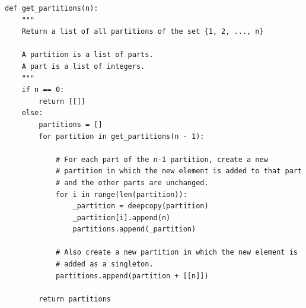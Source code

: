 \documentclass[12pt]{article}
\begin{document}
\begin{mdframed}
\begin{verbatim}
def get_partitions(n):
    """
    Return a list of all partitions of the set {1, 2, ..., n}

    A partition is a list of parts.
    A part is a list of integers.
    """
    if n == 0:
        return [[]]
    else:
        partitions = []
        for partition in get_partitions(n - 1):

            # For each part of the n-1 partition, create a new
            # partition in which the new element is added to that part
            # and the other parts are unchanged.
            for i in range(len(partition)):
                _partition = deepcopy(partition)
                _partition[i].append(n)
                partitions.append(_partition)

            # Also create a new partition in which the new element is
            # added as a singleton.
            partitions.append(partition + [[n]])

        return partitions
  \end{verbatim}
\end{mdframed}

\newpage
\end{document}
